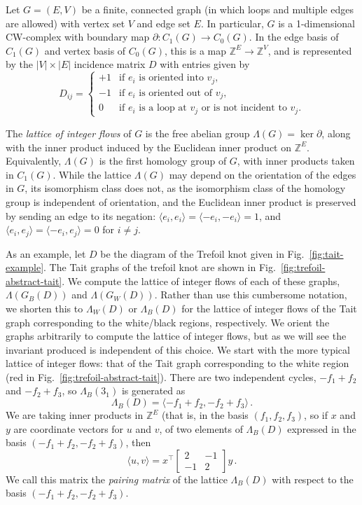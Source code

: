 \documentclass[12pt]{report}
\newcommand{\Z}{\mathbb{Z}}
\newcommand{\ip}[2]{\langle #1, #2 \rangle}
\theoremstyle{upright}
\begin{document}
Let $G = (E, V)$ be a finite, connected graph (in which loops and multiple edges are allowed) with vertex set $V$ and edge set $E$. In particular, $G$ is a 1-dimensional CW-complex with boundary map $\partial: C_{1}(G) \longrightarrow C_{0}(G)$. In the edge basis of $C_{1}(G)$ and vertex basis of $C_{0}(G)$, this is a map $\Z^{E} \longrightarrow \Z^{V}$, and is represented by the $|V|\times|E|$ incidence matrix $D$ with entries given by
\[D_{ij} = \begin{cases}
	+1 & \text{if $e_{i}$ is oriented into $v_{j}$,}   \\
	-1 & \text{if $e_{i}$ is oriented out of $v_{j}$,} \\
	0  & \text{if $e_{i}$ is a loop at $v_{j}$ or is not incident to $v_{j}$.}
\end{cases}\]

The \textit{lattice of integer flows} of $G$ is the free abelian group $\Lambda(G) = \ker \partial$, along with the inner product induced by the Euclidean inner product on $\Z^{E}$. Equivalently, $\Lambda(G)$ is the first homology group of $G$, with inner products taken in $C_{1}(G)$. While the lattice $\Lambda(G)$ may depend on the orientation of the edges in $G$, its isomorphism class does not, as the isomorphism class of the homology group is independent of orientation, and the Euclidean inner product is preserved by sending an edge to its negation: $\ip{e_{i}}{e_{i}} =  \ip{-e_{i}}{-e_{i}} = 1$, and $\ip{e_{i}}{e_{j}} = \ip{-e_{i}}{e_{j}} = 0$ for $i \neq j$.

As an example, let $D$ be the diagram of the Trefoil knot given in Fig.~\ref{fig:tait-example}. The Tait graphs of the trefoil knot   are shown in Fig.~\ref{fig:trefoil-abstract-tait}. We compute the lattice of integer flows of each of these graphs, $\Lambda(G_{B}(D))$ and $\Lambda(G_W(D))$. Rather than use this cumbersome notation, we shorten this to $\Lambda_{W}(D)$ or $\Lambda_{B}(D)$ for the lattice of integer flows of the Tait graph corresponding to the white/black regions, respectively. We orient the graphs arbitrarily to compute the lattice of integer flows, but as we will see the invariant produced is independent of this choice. We start with the more typical lattice of integer flows: that of the Tait graph corresponding to the white region (red in Fig.~\ref{fig:trefoil-abstract-tait}). There are two independent cycles, $-f_{1} + f_{2}$ and $-f_{2} + f_{3}$, so $\Lambda_{B}(3_{1})$ is generated as
\[\Lambda_{B}(D) = \langle -f_{1} + f_{2}, -f_{2} + f_{3} \rangle\,.\]
We are taking inner products in $\Z^{E}$ (that is, in the basis {$(f_{1}, f_{2}, f_{3})$}, so if $x$ and $y$ are coordinate vectors for $u$ and $v$, of two elements of $\Lambda_{B}(D)$ expressed in the basis $(-f_{1} + f_{2}, -f_{2} + f_{3})$, then
\[\langle u, v \rangle = x^{\top}\begin{bmatrix}
	2  & -1 \\
	-1 & 2
\end{bmatrix}y\,.\]
We call this matrix the \textit{pairing matrix} of the lattice $\Lambda_{B}(D)$ with respect to the basis ${(-f_{1} + f_{2}, -f_{2} + f_{3})}$.
\end{document}
